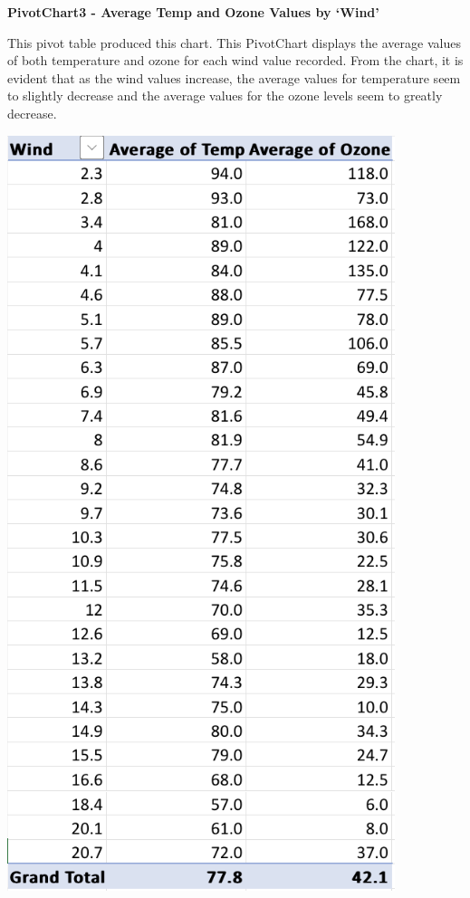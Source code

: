 \documentclass[
  letterpaper,
  DIV=11,
  numbers=noendperiod]{scrreprt}
\begin{document}
\textbf{PivotChart3 - Average Temp and Ozone Values by `Wind'}

This pivot table produced this chart. This PivotChart displays the
average values of both temperature and ozone for each wind value
recorded. From the chart, it is evident that as the wind values
increase, the average values for temperature seem to slightly decrease
and the average values for the ozone levels seem to greatly decrease.

\includegraphics{PivotTable3_AverTempOzoneByWind_Pena.png}
\end{document}
